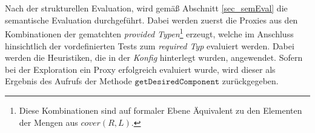 \\\\
Nach der strukturellen Evaluation, wird gemäß Abschnitt \ref{sec_semEval} die semantische Evaluation durchgeführt. Dabei werden zuerst die Proxies aus den Kombinationen der gematchten \emph{provided Typen}\footnote{Diese Kombinationen sind auf formaler Ebene Äquivalent zu den Elementen der Mengen aus $\mathit{cover(R,L)}$.} erzeugt, welche im Anschluss hinsichtlich der vordefinierten Tests zum \emph{required Typ} evaluiert werden. Dabei werden die Heuristiken, die in der \emph{Konfig} hinterlegt wurden, angewendet. Sofern bei der Exploration ein Proxy erfolgreich evaluiert wurde, wird dieser als Ergebnis des Aufrufs der Methode $\texttt{getDesiredComponent}$ zurückgegeben. 
